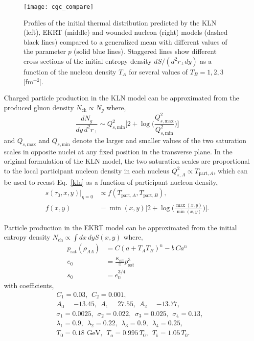 \documentclass[aps,prc,reprint,amsmath,nofootinbib]{revtex4-1}
\newcommand{\nch}{N_\text{ch}}
\newcommand{\TA}{T_{\text{part},A}}
\newcommand{\TB}{T_{\text{part},B}}
\newcommand{\Qmin}{Q_{s,\text{min}}}
\newcommand{\Qmax}{Q_{s,\text{max}}}
\begin{document}
\begin{figure*}
    \texttt{[image: cgc\_compare]}
    \caption{Profiles of the initial thermal distribution predicted by the KLN (left), EKRT (middle) and wounded nucleon (right) models (dashed black lines) compared to a generalized mean with different values of the parameter $p$ (solid blue lines).
    Staggered lines show different cross sections of the initial entropy density $dS/(d^2r_\perp dy)$ as a function of the nucleon density $T_A$ for several values of $T_B = 1, 2, 3$ [fm$^{-2}$].} 
\end{figure*}

Charged particle production in the KLN model can be approximated from the produced gluon density $\nch \propto N_g$ where,
\begin{equation}
    \label{kln}
    \frac{dN_g}{dy\,d^2r_\perp} \sim \Qmin^2 \biggl[ 2 + \log \biggr(\frac{\Qmax^2}{\Qmin^2} \biggr) \biggr]
\end{equation}
and $\Qmax$ and $\Qmin$ denote the larger and smaller values of the two saturation scales in opposite nuclei at any fixed position in the transverse plane.
In the original formulation of the KLN model, the two saturation scales are proportional to the local participant nucleon density in each nucleus $Q^2_{s,A} \propto \TA$, which can be used to recast Eq.~\eqref{kln} as a function of participant nucleon density,
\begin{align}
    s(\tau_0, x, y)\vert_{\eta=0} &\propto f(\TA, \TB), \\
    f(x, y) &= \min(x, y)\biggr[2 + \log \biggr(\frac{\max(x,y)}{\min(x,y)}\biggr) \biggr].
\end{align}

Particle production in the EKRT model can be approximated from the initial entropy density ${\nch \propto \int dx\,dy S(x,y)}$ where,
\begin{align}
    p_\text{sat}(\rho_{AA}) &= C(a + T_A T_B)^n - b\,C a^n \\
    e_0 &= \frac{K_\text{sat}}{\pi} p_\text{sat}^3 \\
    s_0 &= e_0^{3/4} 
\end{align}
with coefficients,
\begin{align*}
    &C_1=0.03, ~~C_2=0.001, \\ 
    &A_0=-13.45, ~~A_1=27.55, ~~A_2=-13.77, \\
    &\sigma_1=0.0025, ~~\sigma_2=0.022, ~~\sigma_3=0.025, ~~\sigma_4=0.13, \\
    &\lambda_1=0.9, ~~\lambda_2=0.22, ~~\lambda_3=0.9, ~~\lambda_4=0.25, \\
    &T_0 = 0.18 \text{ GeV}, ~~T_a = 0.995\, T_0, ~~T_b = 1.05\, T_0.
\end{align*}
\end{document}
